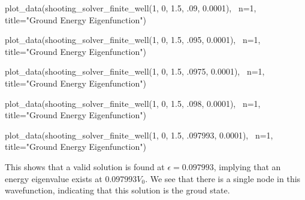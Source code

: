 \documentclass{article}
\begin{document}
\begin{sageblock}
plot_data(shooting_solver_finite_well(1, 0, 1.5, .09, 0.0001), \
          n=1, title="Ground Energy Eigenfunction")
\end{sageblock}
\begin{figure}[H]
\end{figure}

\begin{sageblock}
plot_data(shooting_solver_finite_well(1, 0, 1.5, .095, 0.0001), \
          n=1, title="Ground Energy Eigenfunction")
\end{sageblock}
\begin{figure}[H]
\end{figure}

\begin{sageblock}
plot_data(shooting_solver_finite_well(1, 0, 1.5, .0975, 0.0001), \
          n=1, title="Ground Energy Eigenfunction")
\end{sageblock}
\begin{figure}[H]
\end{figure}

\begin{sageblock}
plot_data(shooting_solver_finite_well(1, 0, 1.5, .098, 0.0001), \
          n=1, title="Ground Energy Eigenfunction")
\end{sageblock}
\begin{figure}[H]
\end{figure}

\begin{sageblock}
plot_data(shooting_solver_finite_well(1, 0, 1.5, .097993, 0.0001), \
          n=1, title="Ground Energy Eigenfunction")
\end{sageblock}
\begin{figure}[H]
\end{figure}

This shows that a valid solution is found at $\epsilon = 0.097993$, implying that an energy eigenvalue exists 
at $0.097993V_0$. We see that there is a single node in this wavefunction, indicating that this solution is the groud state.
\end{document}
